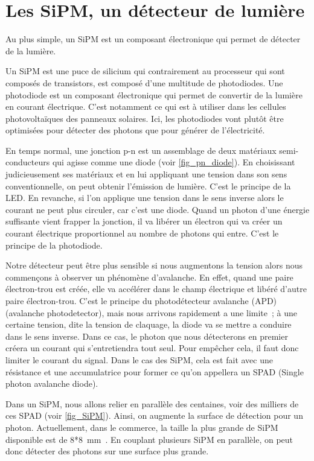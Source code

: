 \section{Les SiPM, un détecteur de lumière}
Au plus simple, un SiPM est un composant électronique qui permet de détecter de la lumière.

Un SiPM est une puce de silicium qui contrairement au processeur qui sont composés de transistors, est composé d'une multitude de photodiodes. Une photodiode est un composant électronique qui permet de convertir de la lumière en courant électrique. C'est notamment ce qui est à utiliser dans les cellules photovoltaïques des panneaux solaires. Ici, les photodiodes vont plutôt être optimisées pour détecter des photons que pour générer de l'électricité. 

En temps normal, une jonction p-n est un assemblage de deux matériaux semi-conducteurs qui agisse comme une diode (voir \cref{fig_pn_diode}). En choisissant judicieusement ses matériaux et en lui appliquant une tension dans son sens conventionnelle, on peut obtenir l'émission de lumière. C'est le principe de la LED. En revanche, si l’on applique une tension dans le sens inverse alors le courant ne peut plus circuler, car c'est une diode. Quand un photon d'une énergie suffisante vient frapper la jonction, il va libérer un électron qui va créer un courant électrique proportionnel au nombre de photons qui entre. C'est le principe de la photodiode.

Notre détecteur peut être plus sensible si nous augmentons la tension alors nous commençons à observer un phénomène d'avalanche. En effet, quand une paire électron-trou est créée, elle va accélérer dans le champ électrique et libéré d'autre paire électron-trou. C'est le principe du photodétecteur avalanche (APD)
(avalanche photodetector), mais nous arrivons rapidement a une limite~; à une certaine tension, dite la tension de claquage, la diode va se mettre a conduire dans le sens inverse. Dans ce cas, le photon que nous détecterons en premier créera un courant qui s'entretiendra tout seul. Pour empêcher cela, il faut donc limiter le courant du signal. Dans le cas des SiPM, cela est fait avec une résistance et une accumulatrice pour former ce qu'on appellera un SPAD (Single photon avalanche diode).

Dans un SiPM, nous allons relier en parallèle des centaines, voir des milliers de ces SPAD (voir \cref{fig_SiPM}). Ainsi, on augmente la surface de détection pour un photon. Actuellement, dans le commerce, la taille la plus grande de SiPM disponible est de 8*8~mm~\cite{}. En couplant plusieurs SiPM en parallèle, on peut donc détecter des photons sur une surface plus grande.

